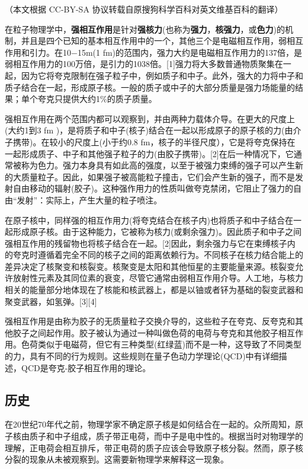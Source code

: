 
（本文根据 CC-BY-SA 协议转载自原搜狗科学百科对英文维基百科的翻译）

在粒子物理学中，\textbf{强相互作用}是针对\textbf{强核力}(也称为\textbf{强力}，\textbf{核强力}，或\textbf{色力})的机制，并且是四个已知的基本相互作用中的一个，其他三个是电磁相互作用，弱相互作用和引力。在10−15m(1 fm)的范围内，强力大约是电磁相互作用力的137倍，是弱相互作用力的100万倍，是引力的1038倍。[1]强力将大多数普通物质聚集在一起，因为它将夸克限制在强子粒子中，例如质子和中子。此外，强大的力将中子和质子结合在一起，形成原子核。一般的质子或中子的大部分质量是强力场能量的结果；单个夸克只提供大约1\%的质子质量。

强相互作用在两个范围内都可以观察到，并由两种力载体介导。在更大的尺度上(大约1到3 fm )，是将质子和中子(核子)结合在一起以形成原子的原子核的力(由介子携带)。在较小的尺度上(小于约0.8 fm，核子的半径尺度），它是将夸克保持在一起形成质子、中子和其他强子粒子的力(由胶子携带)。[2]在后一种情况下，它通常被称为色力。强力本身具有如此高的强度，以至于被强力束缚的强子可以产生新的大质量粒子。因此，如果强子被高能粒子撞击，它们会产生新的强子，而不是发射自由移动的辐射(胶子)。这种强作用力的性质叫做夸克禁闭，它阻止了强力的自由“发射”：实际上，产生大量的粒子喷注。

在原子核中，同样强的相互作用力(将夸克结合在核子内)也将质子和中子结合在一起形成原子核。由于这种能力，它被称为核力(或剩余强力)。因此质子和中子之间强相互作用的残留物也将核子结合在一起。[2]因此，剩余强力与它在束缚核子内的夸克时遵循着完全不同的核子之间的距离依赖行为。不同核子在核力结合能上的差异决定了核聚变和核裂变。核聚变是太阳和其他恒星的主要能量来源。核裂变允许放射性元素及其同位素的衰变，尽管它通常由弱相互作用介导。人工地，与核力相关的能量部分地体现在了核能和核武器上，都是以铀或者钚为基础的裂变武器和聚变武器，如氢弹。[3][4]

强相互作用是由称为胶子的无质量粒子交换介导的，这些粒子在夸克、反夸克和其他胶子之间起作用。胶子被认为通过一种叫做色荷的电荷与夸克和其他胶子相互作用。色荷类似于电磁荷，但它有三种类型(红绿蓝)而不是一种，这导致了不同类型的力，具有不同的行为规则。这些规则在量子色动力学理论(QCD)中有详细描述，QCD是夸克-胶子相互作用的理论。

\subsection{历史}
在20世纪70年代之前，物理学家不确定原子核是如何结合在一起的。众所周知，原子核由质子和中子组成，质子带正电荷，而中子是电中性的。根据当时对物理学的理解，正电荷会相互排斥，带正电荷的质子应该会导致原子核分裂。然而，原子核分裂的现象从未被观察到。这需要新物理学来解释这一现象。

